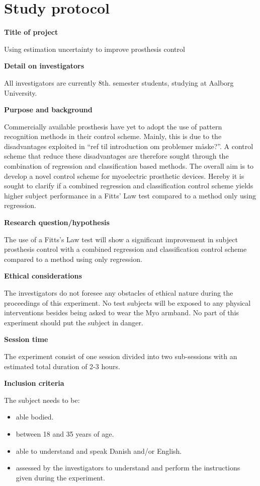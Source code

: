 \section{Study protocol}

\textbf{Title of project}

Using estimation uncertainty to improve prosthesis control 

\textbf{Detail on investigators}

All investigators are currently 8th. semester students, studying at Aalborg University.  

\textbf{Purpose and background}

Commercially available prosthesis have yet to adopt the use of pattern recognition methods in their control scheme. Mainly, this is due to the disadvantages exploited in “ref til introduction om problemer måske?”. A control scheme that reduce these disadvantages are therefore sought through the combination of regression and classification based methods. 
The overall aim is to develop a novel control scheme for myoelectric prosthetic devices. Hereby it is sought to clarify if a combined regression and classification control scheme yields higher subject performance in a Fitts’ Law test compared to a method only using regression.         

\textbf{Research question/hypothesis}

The use of a Fitts’s Law test will show a significant improvement in subject prosthesis control with a combined regression and classification control scheme compared to a method using only regression. 

\textbf{Ethical considerations}  

The investigators do not foresee any obstacles of ethical nature during the proceedings of this experiment. No test subjects will be exposed to any physical interventions besides being asked to wear the Myo armband. No part of this experiment should put the subject in danger. 

\textbf{Session time} 

The experiment consist of one session divided into two sub-sessions with an estimated total duration of 2-3 hours.

\textbf{Inclusion criteria}

The subject needs to be:
\begin{itemize}
	\item able bodied.
	\item between 18 and 35 years of age.
	\item able to understand and speak Danish and/or English.
	\item assessed by the investigators to understand and perform the instructions given during the experiment. 
\end{itemize}



